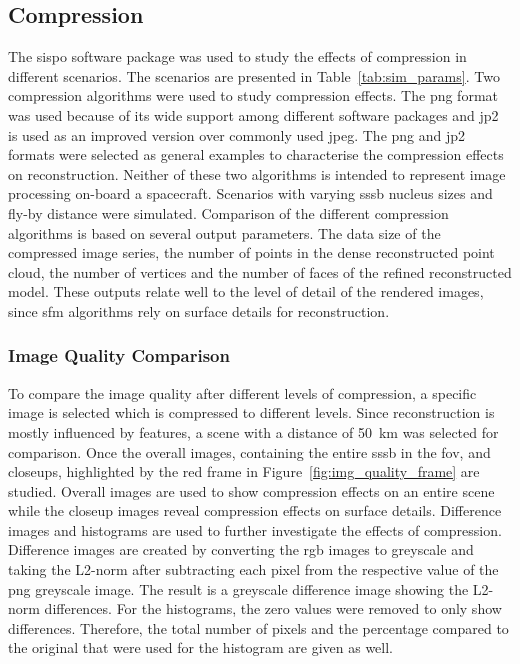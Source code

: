 \subsection{Compression} \label{sec:results_comp}
The \gls{sispo} software package was used to study the effects of compression in different scenarios. The scenarios are presented in Table~\ref{tab:sim_params}. Two compression algorithms were used to study compression effects. The \gls{png} format was used because of its wide support among different software packages and \gls{jp2} is used as an improved version over commonly used \gls{jpeg}. The \gls{png} and \gls{jp2} formats were selected as general examples to characterise the compression effects on reconstruction. Neither of these two algorithms is intended to represent image processing on-board a spacecraft. Scenarios with varying \gls{sssb} nucleus sizes and fly-by distance were simulated. 
Comparison of the different compression algorithms is based on several output parameters. The data size of the compressed image series, the number of points in the dense reconstructed point cloud, the number of vertices and the number of faces of the refined reconstructed model. These outputs relate well to the level of detail of the rendered images, since \gls{sfm} algorithms rely on surface details for reconstruction.

\subsubsection{Image Quality Comparison} \label{sec:img_quali_comp}
To compare the image quality after different levels of compression, a specific image is selected which is compressed to different levels. Since reconstruction is mostly influenced by features, a scene with a distance of \SI{50}{\kilo\meter} was selected for comparison. Once the overall images, containing the entire \gls{sssb} in the \gls{fov}, and closeups, highlighted by the red frame in Figure~\ref{fig:img_quality_frame} are studied. Overall images are used to show compression effects on an entire scene while the closeup images reveal compression effects on surface details. Difference images and histograms are used to further investigate the effects of compression. Difference images are created by converting the \gls{rgb} images to greyscale and taking the L2-norm after subtracting each pixel from the respective value of the \gls{png} greyscale image. The result is a greyscale difference image showing the L2-norm differences. For the histograms, the zero values were removed to only show differences. Therefore, the total number of pixels and the percentage compared to the original that were used for the histogram are given as well.

